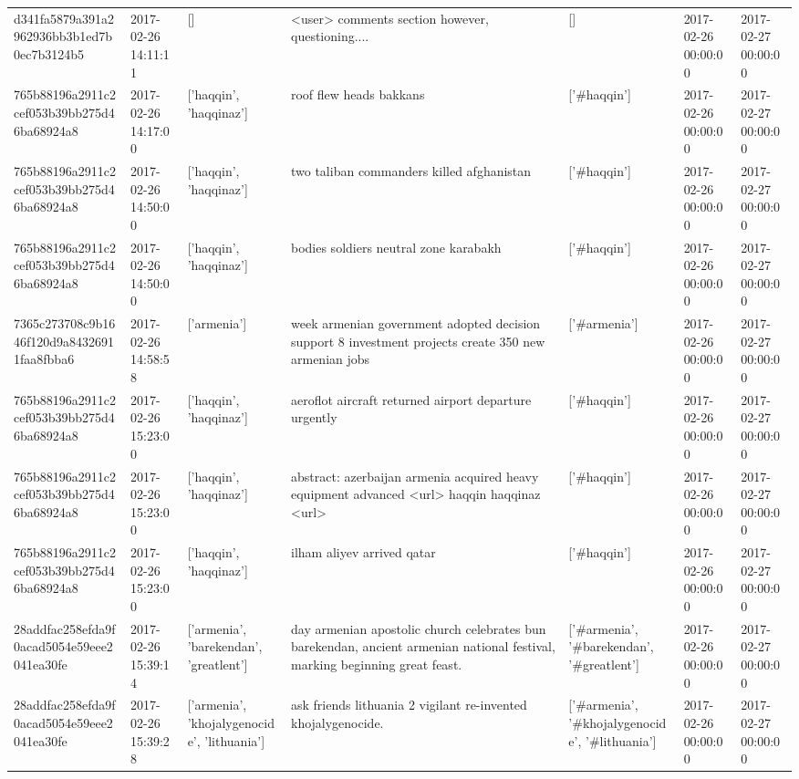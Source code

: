 \begin{tabular}{lllllll}
d341fa5879a391a2962936bb3b1ed7b0ec7b3124b5 & 2017-02-26 14:11:11 & [] & <user> comments section however, questioning.... & [] & 2017-02-26 00:00:00 & 2017-02-27 00:00:00 \\
765b88196a2911c2cef053b39bb275d46ba68924a8 & 2017-02-26 14:17:00 & ['haqqin', 'haqqinaz'] & roof flew heads bakkans & ['#haqqin'] & 2017-02-26 00:00:00 & 2017-02-27 00:00:00 \\
765b88196a2911c2cef053b39bb275d46ba68924a8 & 2017-02-26 14:50:00 & ['haqqin', 'haqqinaz'] & two taliban commanders killed afghanistan & ['#haqqin'] & 2017-02-26 00:00:00 & 2017-02-27 00:00:00 \\
765b88196a2911c2cef053b39bb275d46ba68924a8 & 2017-02-26 14:50:00 & ['haqqin', 'haqqinaz'] & bodies soldiers neutral zone karabakh & ['#haqqin'] & 2017-02-26 00:00:00 & 2017-02-27 00:00:00 \\
7365c273708c9b1646f120d9a84326911faa8fbba6 & 2017-02-26 14:58:58 & ['armenia'] & week armenian government adopted decision support 8 investment projects create 350 new armenian jobs & ['#armenia'] & 2017-02-26 00:00:00 & 2017-02-27 00:00:00 \\
765b88196a2911c2cef053b39bb275d46ba68924a8 & 2017-02-26 15:23:00 & ['haqqin', 'haqqinaz'] & aeroflot aircraft returned airport departure urgently & ['#haqqin'] & 2017-02-26 00:00:00 & 2017-02-27 00:00:00 \\
765b88196a2911c2cef053b39bb275d46ba68924a8 & 2017-02-26 15:23:00 & ['haqqin', 'haqqinaz'] & abstract: azerbaijan armenia acquired heavy equipment advanced <url> haqqin haqqinaz <url> & ['#haqqin'] & 2017-02-26 00:00:00 & 2017-02-27 00:00:00 \\
765b88196a2911c2cef053b39bb275d46ba68924a8 & 2017-02-26 15:23:00 & ['haqqin', 'haqqinaz'] & ilham aliyev arrived qatar & ['#haqqin'] & 2017-02-26 00:00:00 & 2017-02-27 00:00:00 \\
28addfac258efda9f0acad5054e59eee2041ea30fe & 2017-02-26 15:39:14 & ['armenia', 'barekendan', 'greatlent'] & day armenian apostolic church celebrates bun barekendan, ancient armenian national festival, marking beginning great feast. & ['#armenia', '#barekendan', '#greatlent'] & 2017-02-26 00:00:00 & 2017-02-27 00:00:00 \\
28addfac258efda9f0acad5054e59eee2041ea30fe & 2017-02-26 15:39:28 & ['armenia', 'khojalygenocide', 'lithuania'] & ask friends lithuania 2 vigilant re-invented khojalygenocide. & ['#armenia', '#khojalygenocide', '#lithuania'] & 2017-02-26 00:00:00 & 2017-02-27 00:00:00 \\

\end{tabular}
